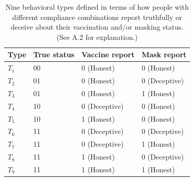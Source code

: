 \documentclass[sigconf,review]{acmart}
\begin{document}
\begin{table}[t]
\centering
\caption{Nine behavioral types defined in terms of how people with different compliance combinations report truthfully or deceive about their vaccination and/or masking status. (See A.2 for explanation.)}
\label{tab:truth-table-9types}
\begin{tabular}{l|l|l|l}
\hline
\textbf{Type} & \textbf{True status} & \textbf{Vaccine report} & \textbf{Mask report} \\
\hline
$T_1$ & 00 & 0 (Honest) & 0 (Honest) \\
$T_2$ & 01 & 0 (Honest) & 0 (Deceptive) \\
$T_3$ & 01 & 0 (Honest) & 1 (Honest) \\
$T_4$ & 10 & 0 (Deceptive) & 0 (Honest) \\
$T_5$ & 10 & 1 (Honest) & 0 (Honest) \\
$T_6$ & 11 & 0 (Deceptive) & 0 (Deceptive) \\
$T_7$ & 11 & 0 (Deceptive) & 1 (Honest) \\
$T_8$ & 11 & 1 (Honest) & 0 (Deceptive) \\
$T_9$ & 11 & 1 (Honest) & 1 (Honest) \\
\hline
\end{tabular}
\end{table}



\end{document}
